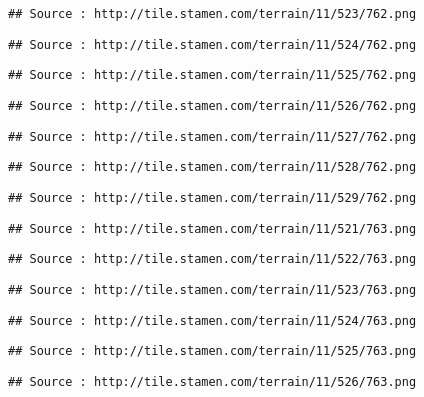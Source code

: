 \documentclass[
]{article}
\begin{document}
\begin{verbatim}
## Source : http://tile.stamen.com/terrain/11/523/762.png
\end{verbatim}

\begin{verbatim}
## Source : http://tile.stamen.com/terrain/11/524/762.png
\end{verbatim}

\begin{verbatim}
## Source : http://tile.stamen.com/terrain/11/525/762.png
\end{verbatim}

\begin{verbatim}
## Source : http://tile.stamen.com/terrain/11/526/762.png
\end{verbatim}

\begin{verbatim}
## Source : http://tile.stamen.com/terrain/11/527/762.png
\end{verbatim}

\begin{verbatim}
## Source : http://tile.stamen.com/terrain/11/528/762.png
\end{verbatim}

\begin{verbatim}
## Source : http://tile.stamen.com/terrain/11/529/762.png
\end{verbatim}

\begin{verbatim}
## Source : http://tile.stamen.com/terrain/11/521/763.png
\end{verbatim}

\begin{verbatim}
## Source : http://tile.stamen.com/terrain/11/522/763.png
\end{verbatim}

\begin{verbatim}
## Source : http://tile.stamen.com/terrain/11/523/763.png
\end{verbatim}

\begin{verbatim}
## Source : http://tile.stamen.com/terrain/11/524/763.png
\end{verbatim}

\begin{verbatim}
## Source : http://tile.stamen.com/terrain/11/525/763.png
\end{verbatim}

\begin{verbatim}
## Source : http://tile.stamen.com/terrain/11/526/763.png
\end{verbatim}
\end{document}
